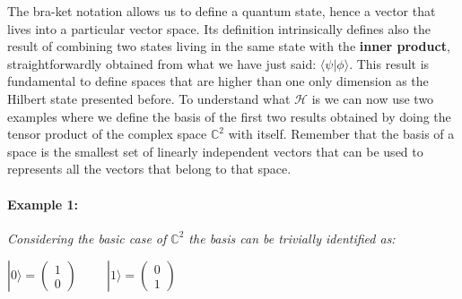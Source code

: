 \documentclass[english]{article}
\newcommand{\zeroket}{\begin{pmatrix} 1 \\ 0 \end{pmatrix}}
\begin{document}
			The bra-ket notation allows us to define a quantum state, hence a vector that lives into a particular vector space. Its definition intrinsically defines also the result of combining two states living in the same state with the \textbf{inner product}, straightforwardly obtained from what we have just said: $\langle\psi|\phi\rangle$. This result is fundamental to define spaces that are higher than one only dimension as the Hilbert state presented before. To understand what $\mathcal{H}$ is we can now use two examples where we define the basis of the first two results obtained by doing the tensor product of the complex space $\mathbb{C}^{2}$ with itself. Remember that the basis of a space is the smallest set of linearly independent vectors that can be used to represents all the vectors that belong to that space.
			
			\paragraph{Example 1:} 
			\label{ex:c2}
			\emph{Considering the basic case of $\mathbb{C}^{2}$ the basis can be trivially identified as:}
			\begin{center}
				$|0\rangle = \zeroket \hspace{1cm} |1\rangle = \begin{pmatrix} 0 \\ 1 \end{pmatrix}$
			\end{center}
		
\end{document}
